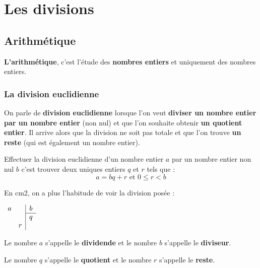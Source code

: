\documentclass[a4paper]{book}
\begin{document}
\setcounter{chapter}{7}
\renewcommand{\monTitre}{Les divisions}
\chapter{\monTitre}
\thispagestyle{fancy}


\section{Arithmétique}    
\textbf{L'arithmétique}, c'est l'étude des \textbf{nombres entiers} et uniquement des nombres entiers.  
\subsection{La division euclidienne}

    On parle de \textbf{division euclidienne} lorsque l'on veut \textbf{diviser un nombre entier par un nombre entier} (non nul) et que l'on souhaite obtenir \textbf{un quotient entier}. Il arrive alors que la division ne soit pas totale et que l'on trouve \textbf{un reste} (qui est également un nombre entier).

    \begin{definition}
        Effectuer la division euclidienne d'un nombre entier $a$ par un nombre entier non nul $b$ c'est trouver deux uniques entiers $q$ et $r$ tels que :
        \[a=bq+r \text{ et } 0\leq r<b\]        
    \end{definition}


    \begin{remarque}
        En cm2, on a plus l'habitude de voir la division posée :

        \medskip

        \begin{minipage}{0.3\linewidth}
            $\begin{array}{cc|c }
                 a & & b \\ \cline{3-3}
                   & & q \\
                   & r &   
            \end{array}$
        \end{minipage}
        \hfill
        \begin{minipage}{0.65\linewidth}
            Le nombre $a$ s'appelle le \textbf{dividende} et le nombre $b$ s'appelle le \textbf{diviseur}.

            \medskip
            
            Le nombre $q$ s'appelle le \textbf{quotient} et le nombre $r$ s'appelle le \textbf{reste}.
        \end{minipage}
    \end{remarque}
\end{document}
